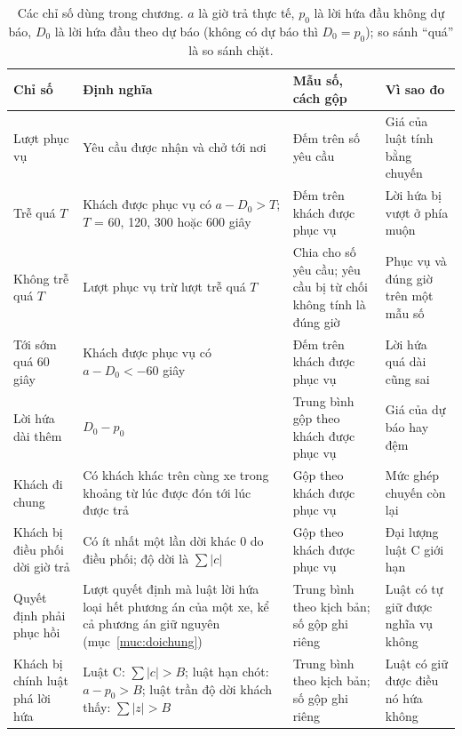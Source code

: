 \begin{table}[htbp]
\centering
\caption{Các chỉ số dùng trong chương. $a$ là giờ trả thực tế, $p_0$ là lời hứa đầu không dự báo, $D_0$
là lời hứa đầu theo dự báo (không có dự báo thì $D_0 = p_0$); so sánh ``quá'' là so sánh chặt.}
\label{bang:c4-chiso}
\footnotesize
\setlength{\tabcolsep}{3pt}
\begin{tabular}{@{}p{2.7cm}p{5.3cm}p{3.5cm}p{3.5cm}@{}}
\toprule
\textbf{Chỉ số} & \textbf{Định nghĩa} & \textbf{Mẫu số, cách gộp} & \textbf{Vì sao đo}\\
\midrule
Lượt phục vụ & Yêu cầu được nhận và chở tới nơi & Đếm trên số yêu cầu & Giá của luật tính bằng
chuyến\\
Trễ quá $T$ & Khách được phục vụ có $a - D_0 > T$; $T$ = 60, 120, 300 hoặc 600 giây & Đếm trên khách
được phục vụ & Lời hứa bị vượt ở phía muộn\\
Không trễ quá $T$ & Lượt phục vụ trừ lượt trễ quá $T$ & Chia cho số yêu cầu; yêu cầu bị từ chối không
tính là đúng giờ & Phục vụ và đúng giờ trên một mẫu số\\
Tới sớm quá 60 giây & Khách được phục vụ có $a - D_0 < -60$ giây & Đếm trên khách được phục vụ & Lời
hứa quá dài cũng sai\\
Lời hứa dài thêm & $D_0 - p_0$ & Trung bình gộp theo khách được phục vụ & Giá của dự báo hay đệm\\
Khách đi chung & Có khách khác trên cùng xe trong khoảng từ lúc được đón tới lúc được trả & Gộp theo
khách được phục vụ & Mức ghép chuyến còn lại\\
Khách bị điều phối dời giờ trả & Có ít nhất một lần dời khác 0 do điều phối; độ dời là $\sum|c|$ &
Gộp theo khách được phục vụ & Đại lượng luật C giới hạn\\
Quyết định phải phục hồi & Lượt quyết định mà luật lời hứa loại hết phương án của một xe, kể cả phương
án giữ nguyên (mục~\ref{muc:doichung}) & Trung bình theo kịch bản; số gộp ghi riêng & Luật có tự giữ
được nghĩa vụ không\\
Khách bị chính luật phá lời hứa & Luật C: $\sum|c| > B$; luật hạn chót: $a - p_0 > B$; luật trần độ dời
khách thấy: $\sum|z| > B$ & Trung bình theo kịch bản; số gộp ghi riêng & Luật có giữ được điều nó hứa
không\\
\bottomrule
\end{tabular}
\end{table}


